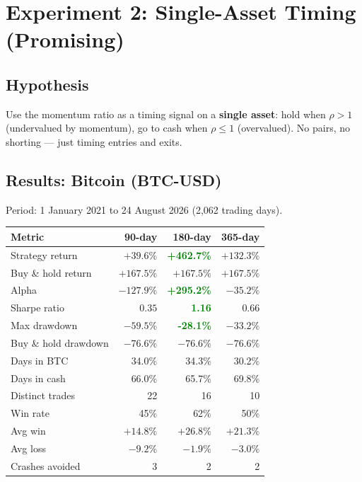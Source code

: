 \documentclass[11pt,a4paper]{article}
\begin{document}

\section{Experiment 2: Single-Asset Timing (Promising)}

\subsection{Hypothesis}

Use the momentum ratio as a timing signal on a \textbf{single asset}:
hold when $\rho > 1$ (undervalued by momentum), go to cash when
$\rho \leq 1$ (overvalued). No pairs, no shorting --- just timing
entries and exits.

\subsection{Results: Bitcoin (BTC-USD)}

Period: 1 January 2021 to 24 August 2026 (2,062 trading days).

\vspace{0.5em}
\begin{tabular}{@{}lrrr@{}}
    \toprule
    \textbf{Metric} & \textbf{90-day} & \textbf{180-day} & \textbf{365-day} \\
    \midrule
    Strategy return    & $+39.6\%$  & \textcolor{green}{\textbf{+462.7\%}} & $+132.3\%$ \\
    Buy \& hold return & $+167.5\%$ & $+167.5\%$  & $+167.5\%$ \\
    Alpha              & $-127.9\%$ & \textcolor{green}{\textbf{+295.2\%}} & $-35.2\%$  \\
    \midrule
    Sharpe ratio       & $0.35$     & \textcolor{green}{\textbf{1.16}}     & $0.66$     \\
    Max drawdown       & $-59.5\%$  & \textcolor{green}{\textbf{-28.1\%}}  & $-33.2\%$  \\
    Buy \& hold drawdown & $-76.6\%$ & $-76.6\%$ & $-76.6\%$ \\
    \midrule
    Days in BTC        & 34.0\%     & 34.3\%     & 30.2\%     \\
    Days in cash       & 66.0\%     & 65.7\%     & 69.8\%     \\
    Distinct trades    & 22         & 16         & 10         \\
    Win rate           & 45\%       & 62\%       & 50\%       \\
    Avg win            & $+14.8\%$  & $+26.8\%$  & $+21.3\%$  \\
    Avg loss           & $-9.2\%$   & $-1.9\%$   & $-3.0\%$   \\
    Crashes avoided    & 3          & 2          & 2          \\
    \bottomrule
\end{tabular}
\end{document}
